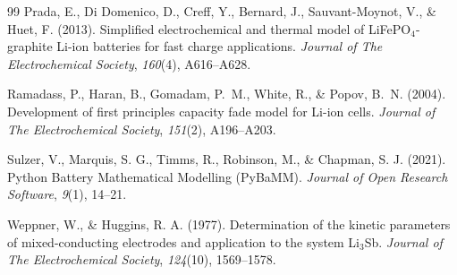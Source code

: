 \documentclass[preprint,12pt,3p,authoryear]{elsarticle}
\begin{document}
\begin{thebibliography}{99}
Prada, E., Di Domenico, D., Creff, Y., Bernard, J., Sauvant-Moynot, V.,
\& Huet, F. (2013). Simplified electrochemical and thermal model of
LiFePO$_{4}$-graphite Li-ion batteries for fast charge applications.
\emph{Journal of The Electrochemical Society}, \emph{160}(4),
A616--A628.

Ramadass, P., Haran, B., Gomadam, P.~M., White, R., \& Popov, B.~N.
(2004). Development of first principles capacity fade model for Li-ion
cells. \emph{Journal of The Electrochemical Society}, \emph{151}(2),
A196--A203.

Sulzer, V., Marquis, S. G., Timms, R., Robinson, M., \& Chapman, S. J.
(2021). Python Battery Mathematical Modelling (PyBaMM). \emph{Journal
of Open Research Software}, \emph{9}(1), 14--21.

Weppner, W., \& Huggins, R. A. (1977). Determination of the kinetic
parameters of mixed-conducting electrodes and application to the system
Li$_{3}$Sb. \emph{Journal of The Electrochemical Society}, \emph{124}(10),
1569--1578.
\end{thebibliography}
\end{document}

